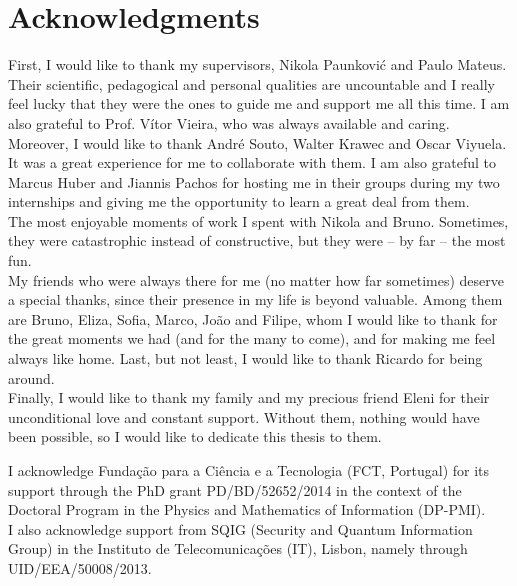 

\chapter*{Acknowledgments}
First, I would like to thank my supervisors, Nikola Paunkovi\'{c} and Paulo Mateus. Their scientific, pedagogical and personal qualities are uncountable and I really feel lucky that they were the ones to guide me and support me all this time. I am also grateful to Prof. V\'{i}tor Vieira, who was always available and caring.\\
Moreover, I would like to thank Andr\'{e} Souto, Walter Krawec and Oscar Viyuela. It was a great experience for me to collaborate with them. I am also grateful to Marcus Huber and Jiannis Pachos for hosting me in their groups during my two internships and giving me the opportunity to learn a great deal from them.\\
The most enjoyable moments of work I spent with Nikola and Bruno. Sometimes, they were catastrophic instead of constructive, but they were -- by far -- the most fun.\\
My friends who were always there for me (no matter how far sometimes) deserve a special thanks, since their presence in my life is beyond valuable.
Among them are Bruno, Eliza, Sofia, Marco, Jo\~{a}o and Filipe, whom I would like to thank for the great moments we had (and for the many to come), and for making me feel always like home. Last, but not least, I would like to thank Ricardo for being around. \\  
Finally, I would like to thank my family and my precious friend Eleni for their unconditional love and constant support. Without them, nothing would have been possible, so I would like to dedicate this thesis to them.

\vfill
\begin{center}\begin{footnotesize}
I acknowledge Funda\c{c}\~{a}o para a Ci\^{e}ncia e a Tecnologia (FCT, Portugal) for its support through the PhD grant PD/BD/52652/2014 in the context of the Doctoral Program in the Physics and Mathematics of Information (DP-PMI).\\
I also acknowledge support from SQIG (Security and Quantum Information Group) in the Instituto de Telecomunica\c{c}\~{o}es (IT), Lisbon, namely through UID/EEA/50008/2013.
\end{footnotesize}
\end{center}

